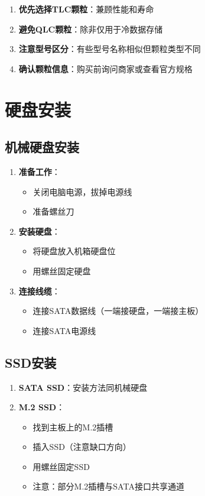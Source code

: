 \documentclass[12pt,UTF8]{ctexbook}
\begin{document}
\begin{enumerate}
    \item \textbf{优先选择TLC颗粒}：兼顾性能和寿命
    \item \textbf{避免QLC颗粒}：除非仅用于冷数据存储
    \item \textbf{注意型号区分}：有些型号名称相似但颗粒类型不同
    \item \textbf{确认颗粒信息}：购买前询问商家或查看官方规格
\end{enumerate}

\chapter{硬盘安装}

\section{机械硬盘安装}

\begin{enumerate}
    \item \textbf{准备工作}：
    \begin{itemize}[leftmargin=2em]
        \item 关闭电脑电源，拔掉电源线
        \item 准备螺丝刀
    \end{itemize}
    
    \item \textbf{安装硬盘}：
    \begin{itemize}[leftmargin=2em]
        \item 将硬盘放入机箱硬盘位
        \item 用螺丝固定硬盘
    \end{itemize}
    
    \item \textbf{连接线缆}：
    \begin{itemize}[leftmargin=2em]
        \item 连接SATA数据线（一端接硬盘，一端接主板）
        \item 连接SATA电源线
    \end{itemize}
\end{enumerate}

\section{SSD安装}

\begin{enumerate}
    \item \textbf{SATA SSD}：安装方法同机械硬盘
    
    \item \textbf{M.2 SSD}：
    \begin{itemize}[leftmargin=2em]
        \item 找到主板上的M.2插槽
        \item 插入SSD（注意缺口方向）
        \item 用螺丝固定SSD
        \item 注意：部分M.2插槽与SATA接口共享通道
    \end{itemize}
\end{enumerate}
\end{document}

